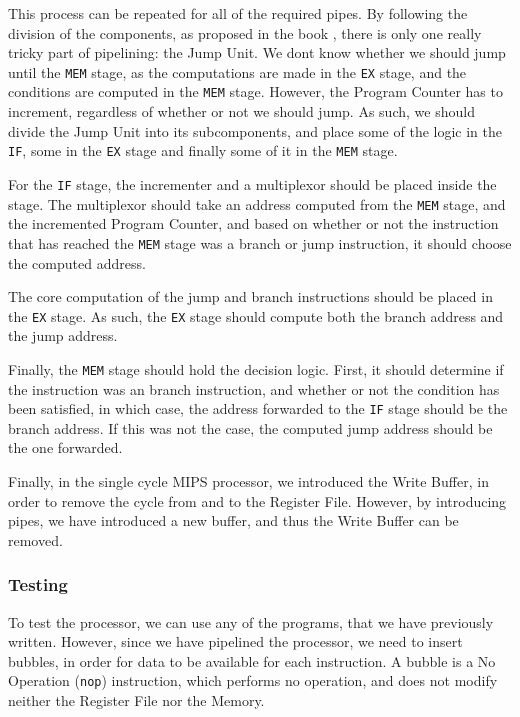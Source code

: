 This process can be repeated for all of the required pipes. By following the
division of the components, as proposed in the book \cite{ref:ark}, there is
only one really tricky part of pipelining: the Jump Unit. We dont know whether
we should jump until the \texttt{MEM} stage, as the computations are made in
the \texttt{EX} stage, and the conditions are computed in the \texttt{MEM}
stage.  However, the Program Counter has to increment, regardless of whether or
not we should jump. As such, we should divide the Jump Unit into its
subcomponents, and place some of the logic in the \texttt{IF}, some in the
\texttt{EX} stage and finally some of it in the \texttt{MEM} stage.

For the \texttt{IF} stage, the incrementer and a multiplexor should be placed
inside the stage. The multiplexor should take an address computed from the
\texttt{MEM} stage, and the incremented Program Counter, and based on whether
or not the instruction that has reached the \texttt{MEM} stage was a branch or
jump instruction, it should choose the computed address.

The core computation of the jump and branch instructions should be placed in
the \texttt{EX} stage. As such, the \texttt{EX} stage should compute both the
branch address and the jump address.

Finally, the \texttt{MEM} stage should hold the decision logic. First, it
should determine if the instruction was an branch instruction, and whether or
not the condition has been satisfied, in which case, the address forwarded to
the \texttt{IF} stage should be the branch address. If this was not the case,
the computed jump address should be the one forwarded.

Finally, in the single cycle MIPS processor, we introduced the Write Buffer, in
order to remove the cycle from and to the Register File. However, by
introducing pipes, we have introduced a new buffer, and thus the Write Buffer
can be removed.

\subsubsection*{Testing} %
To test the processor, we can use any of the programs, that we have previously
written. However, since we have pipelined the processor, we need to insert
bubbles, in order for data to be available for each instruction. A bubble is a
No Operation (\texttt{nop}) instruction, which performs no operation, and does
not modify neither the Register File nor the Memory.

